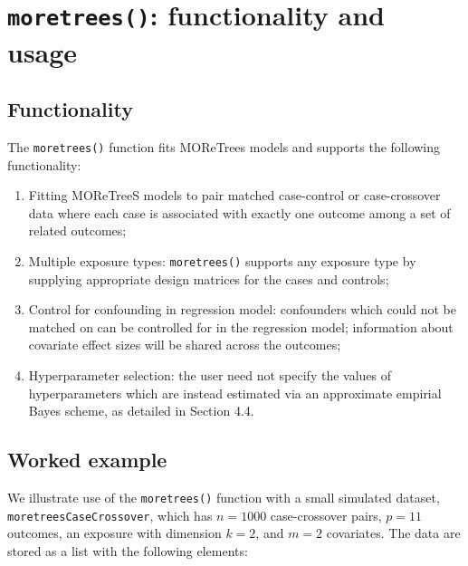 \documentclass[]{article}
\providecommand{\tightlist}{%
  \setlength{\itemsep}{0pt}\setlength{\parskip}{0pt}}
\begin{document}
\hypertarget{code}{%
\section{\texorpdfstring{\texttt{moretrees()}: functionality and
usage}{moretrees(): functionality and usage}}\label{code}}

\hypertarget{functionality}{%
\subsection{Functionality}\label{functionality}}

The \texttt{moretrees()} function fits MOReTrees models and supports the
following functionality:

\begin{enumerate}
\def\labelenumi{\arabic{enumi}.}
\tightlist
\item
  Fitting MOReTreeS models to pair matched case-control or
  case-crossover data where each case is associated with exactly one
  outcome among a set of related outcomes;
\item
  Multiple exposure types: \texttt{moretrees()} supports any exposure
  type by supplying appropriate design matrices for the cases and
  controls;
\item
  Control for confounding in regression model: confounders which could
  not be matched on can be controlled for in the regression model;
  information about covariate effect sizes will be shared across the
  outcomes;
\item
  Hyperparameter selection: the user need not specify the values of
  hyperparameters which are instead estimated via an approximate
  empirial Bayes scheme, as detailed in Section 4.4.
\end{enumerate}

\hypertarget{worked-example}{%
\subsection{Worked example}\label{worked-example}}

We illustrate use of the \texttt{moretrees()} function with a small
simulated dataset, \texttt{moretreesCaseCrossover}, which has
\(n = 1000\) case-crossover pairs, \(p = 11\) outcomes, an exposure with
dimension \(k = 2\), and \(m = 2\) covariates. The data are stored as a
list with the following elements:
\end{document}
